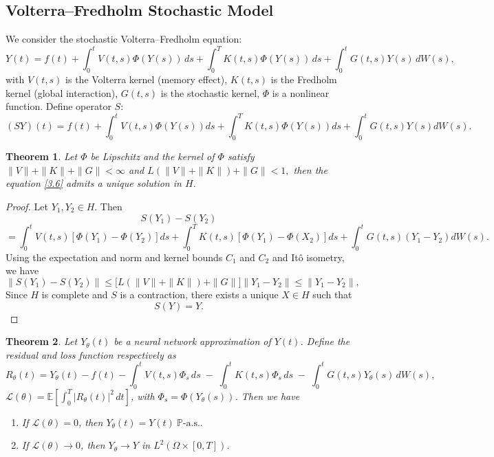 \documentclass[preprint,12pt,authoryear]{elsarticle}
\newtheorem{theorem}{Theorem}
\begin{document}
\subsection{Volterra--Fredholm Stochastic Model}
We consider the stochastic Volterra--Fredholm equation:
\begin{equation}
Y(t) = f(t) + \int_0^t V(t,s)\Phi(Y(s))\,ds 
+ \int_0^T K(t,s)\Phi(Y(s))\,ds 
+ \int_0^t G(t,s)Y(s)\,dW(s),\label{3.5}
\end{equation}
with $V(t,s)$ is the Volterra kernel (memory effect), $K(t,s)$ is the Fredholm kernel (global interaction),
$G(t,s)$ is the stochastic kernel,
$\Phi$ is a nonlinear function. Define operator $S$:
\begin{equation}
(SY)(t) = f(t) + \int_0^t V(t,s)\Phi(Y(s))ds 
+ \int_0^T K(t,s)\Phi(Y(s))ds 
+ \int_0^t G(t,s)Y(s)dW(s). \label{3.6}
\end{equation}
\begin{theorem}
    Let $\Phi$ be Lipschitz and the kernel of $\Phi$ satisfy
$\|V\| + \|K\| + \|G\| < \infty$ and $ L(\|V\| + \|K\|) + \|G\| < 1,$
then the equation \eqref{3.6} admits a unique solution in $H$.
\end{theorem}
\begin{proof}
Let $Y_1, Y_2 \in H$. Then
\[
S(Y_1) - S(Y_2)
\]
\[
= \int_0^t V(t,s)[\Phi(Y_1)-\Phi(Y_2)]ds 
+ \int_0^T K(t,s)[\Phi(Y_1)-\Phi(X_2)]ds 
+ \int_0^t G(t,s)(Y_1-Y_2)dW(s).
\]
Using the expectation and norm and kernel bounds $C_1$ and $C_2$ and It\^o isometry, we have
\[
\|S(Y_1) - S(Y_2)\|
\le \big[ L(\|V\| + \|K\|) + \|G\| \big] \|Y_1 - Y_2\|\le \|Y_1 - Y_2\|,
\]
Since $H$ is complete and $S$ is a contraction, there exists a unique $X \in H$ such that
\[
S(Y) = Y.
\]
\end{proof}
\begin{theorem}
Let $Y_\theta(t)$ be a neural network approximation of $Y(t)$. Define the residual and loss function respectively as
\[
R_\theta(t) = Y_\theta(t) - f(t) - \int_0^t V(t,s)\Phi_s\,ds
\;-\; \int_0^t K(t,s)\Phi_s\,ds
\;-\; \int_0^t G(t,s)Y_\theta(s)\,dW(s),
\]
$\mathcal{L}(\theta) = \mathbb{E}\!\left[\displaystyle\int_0^T |R_\theta(t)|^2\,dt\right]$,
 with $\Phi_s = \Phi(Y_\theta(s))$. \quad
Then we have
\begin{enumerate}
  \item If $\mathcal{L}(\theta) = 0$, then $Y_\theta(t) = Y(t) \ \mathbb{P}\text{-a.s.}.$
  \item If $\mathcal{L}(\theta) \to 0$, then $Y_\theta \to Y$ in $L^2(\Omega \times [0,T])$.
\end{enumerate}
\end{theorem}
 
\end{document}
